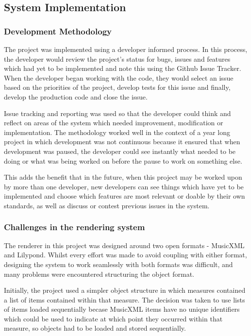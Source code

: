 \subsection{System Implementation}
\subsubsection{Development Methodology}
The project was implemented using a developer informed process. In this process, the developer would review the project's status for bugs, issues and features which had yet to be implemented and note this using the Github Issue Tracker. When the developer began working with the code, they would select an issue based on the priorities of the project, develop tests for this issue and finally, develop the production code and close the issue.


Issue tracking and reporting was used so that the developer could think and reflect on areas of the system which needed improvement, modification or implementation. The methodology worked well in the context of a year long project in which development was not continuous because it ensured that when development was paused, the developer could see instantly what needed to be doing or what was being worked on before the pause to work on something else. 

This adds the benefit that in the future, when this project may be worked upon by more than one developer, new developers can see things which have yet to be implemented and choose which features are most relevant or doable by their own standards, as well as discuss or contest previous issues in the system.


\subsubsection{Challenges in the rendering system}
The renderer in this project was designed around two open formats - MusicXML and Lilypond. Whilst every effort was made to avoid coupling with either format, designing the system to work seamlessly with both formats was difficult, and many problems were encountered structuring the object format.

Initially, the project used a simpler object structure in which measures contained a list of items contained within that measure. The decision was taken to use lists of items loaded sequentially becase MusicXML items have no unique identifiers which could be used to indicate at which point they occurred within that measure, so objects had to be loaded and stored sequentially.


